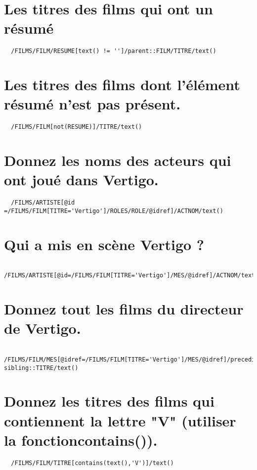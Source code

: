 \section{Les titres des films qui ont un résumé}
\begin{verbatim}
  /FILMS/FILM/RESUME[text() != '']/parent::FILM/TITRE/text()
\end{verbatim}

\section{Les titres des films dont l’élément résumé n’est pas présent.}
\begin{verbatim}
  /FILMS/FILM[not(RESUME)]/TITRE/text()
\end{verbatim}

\section{Donnez les noms des acteurs qui ont joué dans Vertigo.}
\begin{verbatim}
  /FILMS/ARTISTE[@id =/FILMS/FILM[TITRE='Vertigo']/ROLES/ROLE/@idref]/ACTNOM/text() 
\end{verbatim}

\section{Qui a mis en scène Vertigo ?}
\begin{verbatim}
  /FILMS/ARTISTE[@id=/FILMS/FILM[TITRE='Vertigo']/MES/@idref]/ACTNOM/text()
\end{verbatim}

\section{Donnez tout les films du directeur de Vertigo.}
\begin{verbatim}
  /FILMS/FILM/MES[@idref=/FILMS/FILM[TITRE='Vertigo']/MES/@idref]/preceding-sibling::TITRE/text()
\end{verbatim}

\section{Donnez les titres des films qui contiennent la lettre "V" (utiliser la fonctioncontains()).}
\begin{verbatim}
  /FILMS/FILM/TITRE[contains(text(),'V')]/text()
\end{verbatim}

